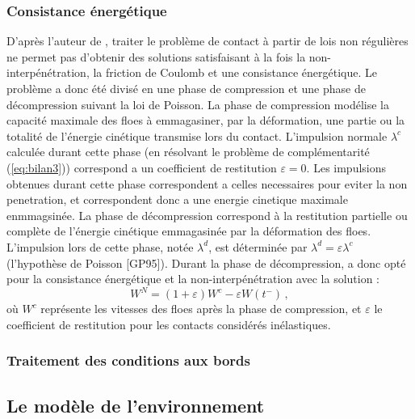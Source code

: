 \subsubsection{Consistance énergétique}
D'après l'auteur de \parencite[p.42]{rabatel2015thesis}, traiter le problème de contact à partir de lois non régulières ne permet pas d’obtenir des solutions satisfaisant à la fois la non-interpénétration, la friction de Coulomb et une consistance énergétique. Le problème a donc été divisé en une phase de compression et une phase de décompression suivant la loi de Poisson. La phase de compression modélise la capacité maximale des
floes à emmagasiner, par la déformation, une partie ou la totalité de l’énergie cinétique transmise lors du contact. L'impulsion normale $\lambda^c$ calculée durant cette phase (en résolvant le problème de complémentarité (\cref{eq:bilan3})) correspond a un coefficient de restitution $\varepsilon = 0$. Les impulsions obtenues durant cette phase correspondent a celles necessaires pour eviter la non penetration, et correspondent donc a une energie cinetique maximale enmmagsinée. La phase de décompression correspond à la restitution partielle ou complète de l’énergie cinétique emmagasinée par la déformation des floes. L’impulsion lors de cette phase, notée $\lambda^d$, est déterminée par $\lambda^d = \varepsilon \lambda^c$ (l’hypothèse de Poisson [GP95]). Durant la phase de décompression, \citeauthor{rabatel2015thesis} a donc opté pour la consistance énergétique et la non-interpénétration avec la solution :
$$
W^N = (1 + \varepsilon)W^{c} - \varepsilon W(t^{-}) \,,
$$
où $W^c$ représente les vitesses des floes après la phase de compression, et $\varepsilon$ le coefficient de restitution pour les contacts considérés inélastiques.

\subsubsection{Traitement des conditions aux bords}

\subsection{Le modèle de l'environnement}


